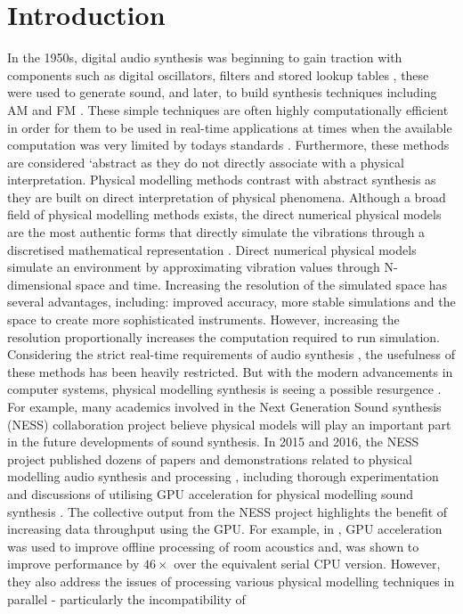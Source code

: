 \documentclass[sigconf]{nimeart}
\begin{document}
\maketitle
\section{Introduction}\label{introduction}

In the 1950s, digital audio synthesis was beginning to gain traction with components such as digital oscillators, filters and stored lookup tables \cite{Bristow1996Wavetable}, these were used to generate sound, and later, to build synthesis techniques including AM and FM \cite{Chowning1986FM}. These simple techniques are often highly computationally efficient \cite{Smith1997Acoustic,Tolonen1998Evaluation} in order for them to be used in real-time applications at times when the available computation was very limited by today\textquotesingle s standards \cite{Bilbao2009Numerical}. Furthermore, these methods are considered `abstract\textquotesingle{} as they do not directly associate with a physical interpretation. Physical modelling methods contrast with abstract synthesis as they are built on direct interpretation of physical phenomena. Although a broad field of physical modelling methods exists, the direct numerical physical models are the most authentic forms that directly simulate the vibrations through a discretised mathematical representation \cite{Berg1990physics}. Direct numerical physical models simulate an environment by approximating vibration values through N-dimensional space and time. Increasing the resolution of the simulated space has several advantages, including: improved accuracy, more stable simulations and the space to create more sophisticated instruments. However, increasing the resolution proportionally increases the computation required to run simulation. Considering the strict real-time requirements of audio synthesis \cite{Lavry2004Sampling,Jack2018Action}, the usefulness of these methods has been heavily restricted. But with the modern advancements in computer systems, physical modelling synthesis is seeing a possible resurgence \cite{Webb2015On}. For example, many academics involved in the Next Generation Sound synthesis (NESS) collaboration project believe physical models will play an important part in the future developments of sound synthesis. In 2015 and 2016, the NESS project published dozens of papers and demonstrations related to physical modelling audio synthesis and processing \cite{NESS2019Faustmanual}, including thorough experimentation and discussions of utilising GPU acceleration for physical modelling sound synthesis \cite{Bilbao2019Large,Hsu2013Realtime,Bilbao2012Timpani}. The collective output from the NESS project highlights the benefit of increasing data throughput using the GPU. For example, in \cite{Hamilton2013Room}, GPU acceleration was used to improve offline processing of room acoustics and, was shown to improve performance by $46\times$ over the equivalent serial CPU version. However, they also address the issues of processing various physical modelling techniques in parallel - particularly the incompatibility of 
\end{document}
